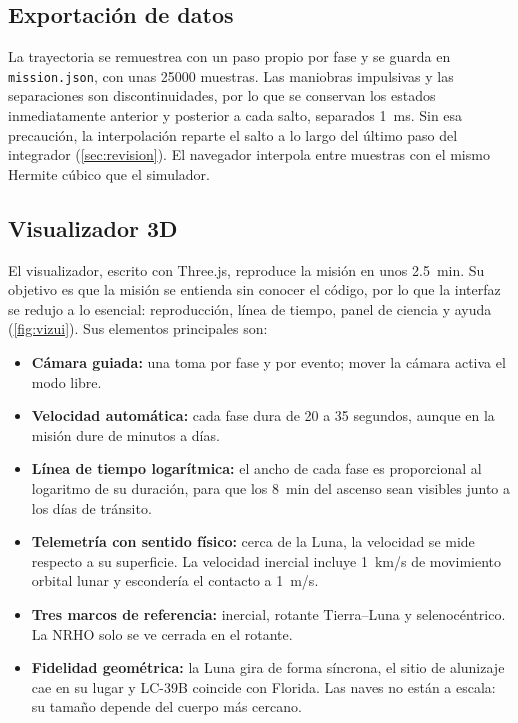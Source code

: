 \documentclass[11pt,a4paper]{article}
\begin{document}
\subsection{Exportación de datos}
La trayectoria se remuestrea con un paso propio por fase y se guarda en \texttt{mission.json}, con unas \num{25000} muestras. Las maniobras impulsivas y las separaciones son discontinuidades, por lo que se conservan los estados inmediatamente anterior y posterior a cada salto, separados \SI{1}{ms}. Sin esa precaución, la interpolación reparte el salto a lo largo del último paso del integrador (\autoref{sec:revision}). El navegador interpola entre muestras con el mismo Hermite cúbico que el simulador.

\subsection{Visualizador 3D}
El visualizador, escrito con Three.js, reproduce la misión en unos \SI{2.5}{min}. Su objetivo es que la misión se entienda sin conocer el código, por lo que la interfaz se redujo a lo esencial: reproducción, línea de tiempo, panel de ciencia y ayuda (\autoref{fig:vizui}). Sus elementos principales son:
\begin{itemize}
  \item \textbf{Cámara guiada:} una toma por fase y por evento; mover la cámara activa el modo libre.
  \item \textbf{Velocidad automática:} cada fase dura de 20 a 35 segundos, aunque en la misión dure de minutos a días.
  \item \textbf{Línea de tiempo logarítmica:} el ancho de cada fase es proporcional al logaritmo de su duración, para que los \SI{8}{min} del ascenso sean visibles junto a los días de tránsito.
  \item \textbf{Telemetría con sentido físico:} cerca de la Luna, la velocidad se mide respecto a su superficie. La velocidad inercial incluye \SI{1}{km/s} de movimiento orbital lunar y escondería el contacto a \SI{1}{m/s}.
  \item \textbf{Tres marcos de referencia:} inercial, rotante Tierra--Luna y selenocéntrico. La NRHO solo se ve cerrada en el rotante.
  \item \textbf{Fidelidad geométrica:} la Luna gira de forma síncrona, el sitio de alunizaje cae en su lugar y LC-39B coincide con Florida. Las naves no están a escala: su tamaño depende del cuerpo más cercano.
\end{itemize}
\end{document}
